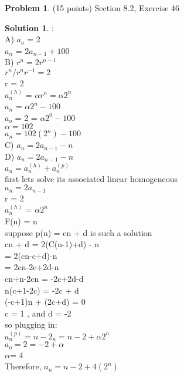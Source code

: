\documentclass{article}
\theoremstyle{definition}
\newtheorem{problem}{Problem}
\newtheorem*{solution}{Solution}
\begin{document}
\begin{problem} (15 points) Section 8.2, Exercise 46
\end{problem}
\begin{solution} :
\\

A) $a_o$ = 2
\\
$a_n$ = $2a_{n-1} + 100$
\\

B) $r^n = 2r^{n-1}$
\\
$r^n / r^n r^{-1}  = 2$
\\
r = 2
\\
$a_n^{(h)}$ = $\alpha$$r^n = \alpha2^n$
\\
$a_n$ = $\alpha2^n - 100$
\\
$a_o$ = 2 = $\alpha2^0 - 100$
\\
$\alpha = 102$
\\
$a_n = 102(2^n)-100$
\\

C) $a_n = 2a_{n-1}-n$
\\

D) $a_n = 2a_{n-1}-n$
\\
$a_n = a_n^{(h)} + a_n^{(p)}$
\\
first lets solve its associated linear homogeneous 
\\
$a_n = 2a_{n-1}$
\\
r = 2
\\
 $a_n^{(h)}$ = $\alpha2^n$
 \\
 F(n) = n
 \\
 suppose p(n) = cn + d is such a solution
 \\
 cn + d = 2(C(n-1)+d) - n
 \\
 = 2(cn-c+d)-n
 \\
 = 2cn-2c+2d-n
 \\
 cn+n-2cn = -2c+2d-d
 \\
 n(c+1-2c) = -2c + d
 \\
 (-c+1)n + (2c+d) = 0
 \\
 c = 1 , and d = -2
 \\
 so plugging in:
 \\
 $a_n^{(p)} = n-2_n = n - 2 + \alpha2^n$
 \\
$ a_o = 2 = -2 + \alpha$
\\
$\alpha $= 4
\\
Therefore, $a_n = n - 2 + 4(2^n)$
  

\end{solution}

\newpage
\end{document}
